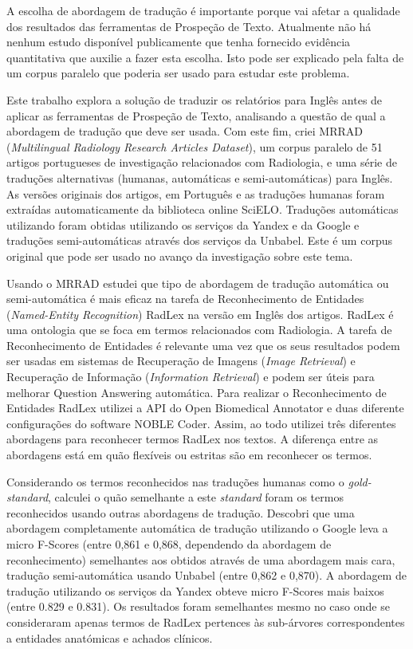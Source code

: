 \begin{abstractspt}
A escolha de abordagem de tradução é importante porque vai afetar a qualidade dos resultados das ferramentas de Prospeção de Texto. Atualmente não há nenhum estudo disponível publicamente que tenha fornecido evidência quantitativa que auxilie a fazer esta escolha. Isto pode ser explicado pela falta de um corpus paralelo que poderia ser usado para estudar este problema. 

Este trabalho explora a solução de traduzir os relatórios para Inglês antes de aplicar as ferramentas de Prospeção de Texto, analisando a questão de qual a abordagem de tradução que deve ser usada. Com este fim, criei MRRAD (\textit{Multilingual Radiology Research Articles Dataset}), um corpus paralelo de 51 artigos portugueses de investigação relacionados com Radiologia, e uma série de traduções alternativas (humanas, automáticas e semi-automáticas) para Inglês. As versões originais dos artigos, em Português e as traduções humanas foram extraídas automaticamente da biblioteca online SciELO. Traduções automáticas utilizando foram obtidas utilizando os serviços da Yandex e da Google e traduções semi-automáticas através dos serviços da Unbabel. Este é um corpus original que pode ser usado no avanço da investigação sobre este tema.

Usando o MRRAD estudei que tipo de abordagem de tradução automática ou semi-automática é mais eficaz na tarefa de Reconhecimento de Entidades (\textit{Named-Entity Recognition}) RadLex na versão em Inglês dos artigos. RadLex é uma ontologia que se foca em termos relacionados com Radiologia. A tarefa de Reconhecimento de Entidades é relevante uma vez que os seus resultados podem ser usadas em sistemas de Recuperação de Imagens (\textit{Image Retrieval}) e Recuperação de Informação (\textit{Information Retrieval}) e podem ser úteis para melhorar Question Answering automática. Para realizar o Reconhecimento de Entidades RadLex utilizei a API do Open Biomedical Annotator e duas diferente configurações do software NOBLE Coder. Assim, ao todo utilizei três diferentes abordagens para reconhecer termos RadLex nos textos. A diferença entre as abordagens está em quão flexíveis ou estritas são em reconhecer os termos. 

Considerando os termos reconhecidos nas traduções humanas como o \textit{gold-standard}, calculei o quão semelhante a este \textit{standard} foram os termos reconhecidos usando outras abordagens de tradução. Descobri que uma abordagem completamente automática de tradução utilizando o Google leva a micro F-Scores (entre 0,861 e 0,868, dependendo da abordagem de reconhecimento) semelhantes aos obtidos através de uma abordagem mais cara, tradução semi-automática usando Unbabel (entre 0,862 e 0,870). A abordagem de tradução utilizando os serviços da Yandex obteve micro F-Scores mais baixos (entre 0.829 e 0.831). Os resultados foram semelhantes mesmo no caso onde se consideraram apenas termos de RadLex pertences às sub-árvores correspondentes a entidades anatómicas e achados clínicos. 


\end{abstractspt}
